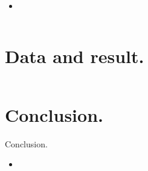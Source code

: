 \documentclass{beamer}
\def\timeleft{15:00->14:55}
\begin{document}
\def\timeleft{7:30 -> 4:00}
\begin{frame}{}
  \begin{columns}
    \column{5.5cm}
    \begin{block}{}
      \begin{itemize}[<+->]
      \item
      \end{itemize}
    \end{block}
    \column{5.5cm}
  \end{columns}
\end{frame}

\def\timeleft{4:00->3:00}
\section{Data and result.}
\begin{frame}{}
  \begin{columns}
    \column{6cm}
    \column{6cm}
  \end{columns}
\end{frame}

\def\timeleft{0:30->0:00}
\section{Conclusion.}
\begin{frame}{Conclusion.}
  \begin{block}{}
    \begin{itemize}[<+->]
    \item
    \end{itemize}
  \end{block}
\end{frame}

\begin{frame}{}
\end{frame}

\begin{frame}{}
\end{frame}
\end{document}
